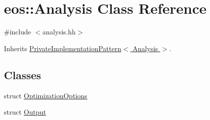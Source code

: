 \hypertarget{classeos_1_1Analysis}{
\section{eos::Analysis Class Reference}
\label{classeos_1_1Analysis}
}


{\ttfamily \#include $<$analysis.hh$>$}

Inherits \hyperlink{classeos_1_1PrivateImplementationPattern}{PrivateImplementationPattern$<$ Analysis $>$}.\subsection*{Classes}
\begin{DoxyCompactItemize}
\item 
struct \hyperlink{structeos_1_1Analysis_1_1OptimizationOptions}{OptimizationOptions}
\item 
struct \hyperlink{structeos_1_1Analysis_1_1Output}{Output}
\end{DoxyCompactItemize}
